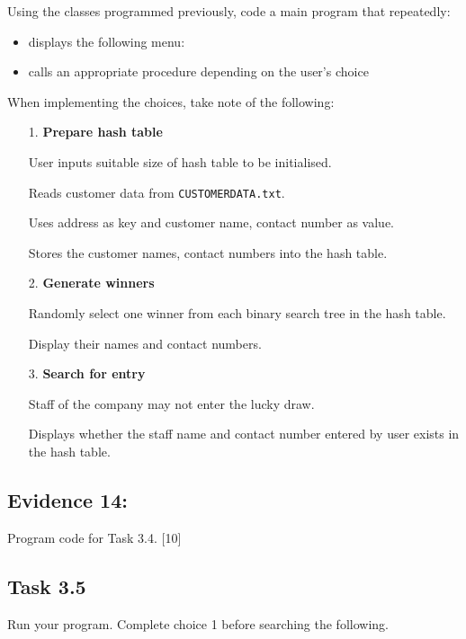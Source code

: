 Using the classes programmed previously, code a main program that
repeatedly: 
\begin{itemize}
\item displays the following menu:

\noindent{}
\item calls an appropriate procedure depending on the user\textquoteright s
choice
\end{itemize}
When implementing the choices, take note of the following: 
\begin{enumerate}
\item[1.] \textbf{ Prepare hash table} 

User inputs suitable size of hash table to be initialised.

Reads customer data from \texttt{CUSTOMERDATA.txt}. 

Uses address as key and customer name, contact number as value.

Stores the customer names, contact numbers into the hash table. 
\item[2.] \textbf{ Generate winners} 

Randomly select one winner from each binary search tree in the hash
table.

Display their names and contact numbers. 
\item[3.]  \textbf{Search for entry} 

Staff of the company may not enter the lucky draw. 

Displays whether the staff name and contact number entered by user
exists in the hash table. 
\end{enumerate}

\subsection*{Evidence 14: }

Program code for Task 3.4. \hfill{}{[}10{]}

\subsection*{Task 3.5}

Run your program. Complete choice 1 before searching the following. 

